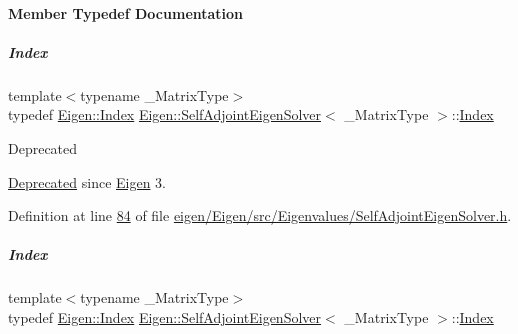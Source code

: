 \paragraph{Member Typedef Documentation}
\mbox{\label{group___eigenvalues___module_a8a59ab7734b6eae2754fd78bc7c3a360}} 
\subparagraph{\texorpdfstring{Index}{Index}\hspace{0.1cm}{\footnotesize\ttfamily [1/2]}}
{\footnotesize\ttfamily template$<$typename \+\_\+\+Matrix\+Type$>$ \\
typedef \hyperlink{namespace_eigen_a62e77e0933482dafde8fe197d9a2cfde}{Eigen\+::\+Index} \hyperlink{group___eigenvalues___module_class_eigen_1_1_self_adjoint_eigen_solver}{Eigen\+::\+Self\+Adjoint\+Eigen\+Solver}$<$ \+\_\+\+Matrix\+Type $>$\+::\hyperlink{group___eigenvalues___module_a8a59ab7734b6eae2754fd78bc7c3a360}{Index}}

\begin{DoxyRefDesc}{Deprecated}
\item[\hyperlink{deprecated__deprecated000023}{Deprecated}]since \hyperlink{namespace_eigen}{Eigen} 3. \end{DoxyRefDesc}


Definition at line \hyperlink{eigen_2_eigen_2src_2_eigenvalues_2_self_adjoint_eigen_solver_8h_source_l00084}{84} of file \hyperlink{eigen_2_eigen_2src_2_eigenvalues_2_self_adjoint_eigen_solver_8h_source}{eigen/\+Eigen/src/\+Eigenvalues/\+Self\+Adjoint\+Eigen\+Solver.\+h}.

\mbox{\label{group___eigenvalues___module_a8a59ab7734b6eae2754fd78bc7c3a360}} 
\subparagraph{\texorpdfstring{Index}{Index}\hspace{0.1cm}{\footnotesize\ttfamily [2/2]}}
{\footnotesize\ttfamily template$<$typename \+\_\+\+Matrix\+Type$>$ \\
typedef \hyperlink{namespace_eigen_a62e77e0933482dafde8fe197d9a2cfde}{Eigen\+::\+Index} \hyperlink{group___eigenvalues___module_class_eigen_1_1_self_adjoint_eigen_solver}{Eigen\+::\+Self\+Adjoint\+Eigen\+Solver}$<$ \+\_\+\+Matrix\+Type $>$\+::\hyperlink{group___eigenvalues___module_a8a59ab7734b6eae2754fd78bc7c3a360}{Index}}

